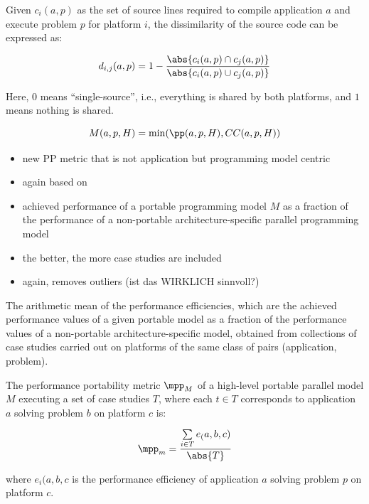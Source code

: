 \begin{definition}
Given $c_i(a, p)$ as the set of source lines required to compile application $a$ and execute problem $p$ for platform $i$, the dissimilarity of the source code can be expressed as:

$$d_{i, j}(a, p) = 1 - \frac{\abs{c_i(a, p) \cap c_j(a, p)}}{\abs{c_i(a, p) \cup c_j(a, p)}}$$
\end{definition}
Here, $0$ means \enquote{single-source}, i.e., everything is shared by both platforms, and $1$ means nothing is shared. 

\begin{definition}
    $$M(a, p, H) = \min(\pp(a, p, H), CC(a, p, H))$$
\end{definition}


\newpage
\cite{marowka_performance_2022}

\begin{itemize}
    \item new PP metric that is not application but programming model centric
    \item again based on \mpp
    \item achieved performance of a portable programming model $M$ as a fraction of the performance of a non-portable architecture-specific parallel programming model
    \item the better, the more case studies are included
    \item again, removes outliers (ist das WIRKLICH sinnvoll?)
    
\end{itemize}

\begin{definition}
The arithmetic mean of the performance efficiencies, which are the achieved performance values of a given portable model as a fraction of the performance values of a non-portable architecture-specific model, obtained from collections of case studies carried out on platforms of the same class of pairs (application, problem).
\end{definition}

\begin{definition}
The performance portability metric $\mpp_M$ of a high-level portable parallel model $M$ executing a set of case studies $T$, where each $t \in T$ corresponds to application $a$ solving problem $b$  on platform $c$ is: 

$$\mpp_m = \frac{\sum\limits_{i \in T} e_(a, b, c)}{\abs{T}}$$

where $e_i(a, b, c$ is the performance efficiency of application $a$ solving problem $p$ on platform $c$.
\end{definition}


